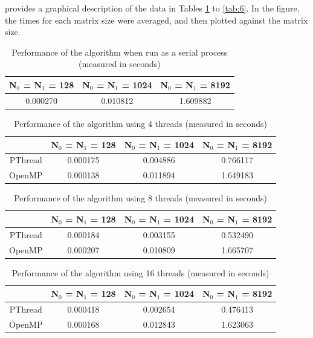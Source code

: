 \documentclass[10pt,twocolumn]{witseiepaper}
\begin{document}
 provides a graphical description of the data in Tables \ref{tab:1} to \ref{tab:6}. In the figure, the times for each matrix size were averaged, and then plotted against the matrix size.

\begin{table}[h]
	\centering
	\caption{Performance of the algorithm when run as a serial process (measured in seconds)}
	\begin{tabular}{|c|c|c|}
	\hline
	  N$_{0}$ = N$_{1}$ = 128 &  N$_{0}$ = N$_{1}$ = 1024 & N$_{0}$ = N$_{1}$ = 8192 \\
		\hline 
		0.000270  & 0.010812 & 1.609882 \\ 
		\hline 
	\end{tabular}
\label{tab:1} 
\end{table} 

\begin{table}[h]
\centering
\caption{Performance of the algorithm using 4 threads (measured in seconds)}
\begin{tabular}{|c|c|c|c|}
	\hline 
	 & N$_{0}$ = N$_{1}$ = 128 &  N$_{0}$ = N$_{1}$ = 1024 & N$_{0}$ = N$_{1}$ = 8192 \\ 
	\hline 
	PThread & 0.000175 & 0.004886 & 0.766117 \\ 
	\hline 
	OpenMP & 0.000138 & 0.011894 & 1.649183 \\ 
	\hline 
\end{tabular}
\label{tab:2} 
\end{table} 

\begin{table}[h]
		\centering
\caption{Performance of the algorithm using 8 threads (measured in seconds)}
\begin{tabular}{|c|c|c|c|}
	\hline 
	 & N$_{0}$ = N$_{1}$ = 128 &  N$_{0}$ = N$_{1}$ = 1024 & N$_{0}$ = N$_{1}$ = 8192 \\ 
	\hline 
	PThread & 0.000184 & 0.003155 & 0.532490 \\ 
	\hline 
	OpenMP & 0.000207 & 0.010809 & 1.665707 \\ 
	\hline 
\end{tabular} 
\label{tab:3} 
\end{table}

\begin{table}[h]
		\centering
	\caption{Performance of the algorithm using 16 threads (measured in seconds)}
\begin{tabular}{|c|c|c|c|}
	\hline 
	 & N$_{0}$ = N$_{1}$ = 128 &  N$_{0}$ = N$_{1}$ = 1024 & N$_{0}$ = N$_{1}$ = 8192 \\ 
	\hline 
	PThread & 0.000418 & 0.002654 & 0.476413 \\ 
	\hline 
	OpenMP & 0.000168 & 0.012843 & 1.623063 \\ 
	\hline 
\end{tabular} 
\label{tab:4} 
\end{table}
\end{document}
